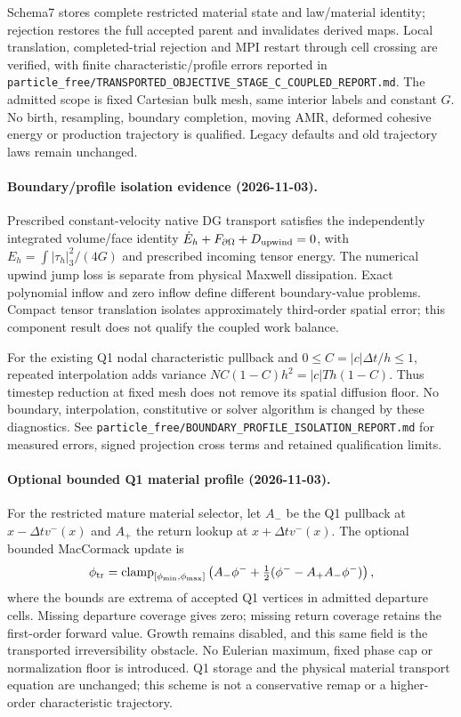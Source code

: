 \documentclass[11pt]{article}
\begin{document}
Schema7 stores complete restricted material state and law/material identity;
rejection restores the full accepted parent and invalidates derived maps.
Local translation, completed-trial rejection and MPI restart through cell
crossing are verified, with finite characteristic/profile errors reported in
\texttt{particle\_free/TRANSPORTED\_OBJECTIVE\_STAGE\_C\_COUPLED\_REPORT.md}.
The admitted scope is fixed Cartesian bulk mesh, same interior labels and
constant $G$. No birth, resampling, boundary completion, moving AMR, deformed
cohesive energy or production trajectory is qualified. Legacy defaults and
old trajectory laws remain unchanged.


\paragraph{Boundary/profile isolation evidence (2026-11-03).}
Prescribed constant-velocity native DG transport satisfies the independently
integrated volume/face identity
$\dot E_h+F_{\partial\Omega}+D_{\rm upwind}=0$, with
$E_h=\int|\tau_h|_3^2/(4G)$ and prescribed incoming tensor energy.
The numerical upwind jump loss is separate from physical Maxwell dissipation.
Exact polynomial inflow and zero inflow define different boundary-value
problems. Compact tensor translation isolates approximately third-order spatial
error; this component result does not qualify the coupled work balance.

For the existing Q1 nodal characteristic pullback and
$0\le C=|c|\Delta t/h\le1$, repeated interpolation adds variance
$NC(1-C)h^2=|c|Th(1-C)$. Thus timestep reduction at fixed mesh does not remove
its spatial diffusion floor. No boundary, interpolation, constitutive or solver
algorithm is changed by these diagnostics. See
\texttt{particle\_free/BOUNDARY\_PROFILE\_ISOLATION\_REPORT.md} for measured
errors, signed projection cross terms and retained qualification limits.

\paragraph{Optional bounded Q1 material profile (2026-11-03).}
For the restricted mature material selector, let $A_-$ be the Q1 pullback
at $x-\Delta t v^-(x)$ and $A_+$ the return lookup at $x+\Delta t v^-(x)$.
The optional bounded MacCormack update is
\[
 \phi_{\rm tr}=\operatorname{clamp}_{[\phi_{\min},\phi_{\max}]}
 \left(A_-\phi^-+\tfrac12(\phi^- - A_+A_-\phi^-)\right),
\]
where the bounds are extrema of accepted Q1 vertices in admitted departure
cells. Missing departure coverage gives zero; missing return coverage retains
the first-order forward value. Growth remains disabled, and this same field
is the transported irreversibility obstacle. No Eulerian maximum, fixed phase
cap or normalization floor is introduced. Q1 storage and the physical material
transport equation are unchanged; this scheme is not a conservative remap or
a higher-order characteristic trajectory.
\end{document}
